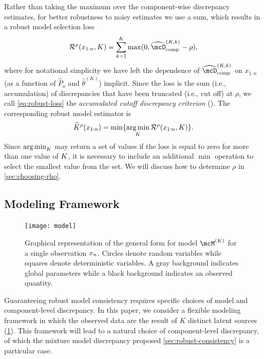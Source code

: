 Rather than taking the maximum over the component-wise discrepancy estimates, for better robustness
to noisy estimates we use a sum, which results in a robust model selection loss 
\[ \label{eq:robust-loss}
	\mathcal{R}^\rho(x_{1:n}, K) = \sum_{k=1}^K \max(0, \compDiscEst^{(K,k)} - \rho),
\]
where for notational simplicity we have left the dependence of $\compDiscEst^{(K,k)}$ on $x_{1:n}$ 
(as a function of $\widehat{P}_o$ and $\widehat\theta^{(K)}$) implicit. 
Since the loss is the sum (i.e., accumulation) of discrepancies that have been truncated (i.e., cut off) at $\rho$,
we call \cref{eq:robust-loss} the \emph{accumulated cutoff discrepancy criterion} (\methodname).
The corresponding robust model estimator is
\[
\widehat{K}^\rho(x_{1:n}) = \min\{\argmin_K \mathcal{R}^\rho(x_{1:n}, K)\}.
\]
Since $\argmin_{\numcomps}$ may return a set of values if the loss is equal to
zero for more than one value of $K$, it is necessary to include an
additional $\min$ operation to select the smallest value from the set.
We will discuss how to determine $\rho$ in \cref{sec:choosing-rho}. 

\subsection{Modeling Framework} \label{sec:framework}

\begin{figure}[tp]
	\centering
	\texttt{[image: model]}
	\caption{Graphical representation of the general form for model $\model{K}$ for a single observation $x_{n}$.
		Circles denote random variables while squares denote deterministic variables.
		A gray background indicates global parameters while a black background indicates an observed quantity.}
	\label{fig:model}
\end{figure}

Guaranteeing robust model consistency requires specific choices of model and component-level discrepancy.
In this paper, we consider a flexible modeling framework in which the observed data are the result of $K$ distinct latent sources (\cref{fig:model}). 
This framework will lead to a natural choice of component-level discrepancy, of which the mixture model
discrepancy proposed \cref{sec:robust-consistency} is a particular case. 

